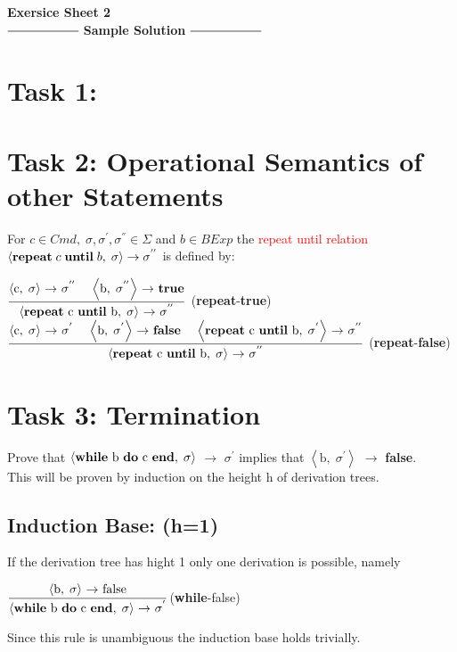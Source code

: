 \documentclass[12pt,a4paper]{article}
\newcommand{\eRelation}[2]{$\dfrac{\text{#1}}{\text{#2}}$}
\newcommand{\eState}[2]{$\left< \text{#1},\; \text{#2}\right>$}
\newcommand{\eRule}[3]{\eState{#1}{#2} $\rightarrow$ #3}
\begin{document}
	\begin{center}
		\huge\textbf{Exersice Sheet 2}\\[0.5cm]
	
		\Large
		$\mathrel{\vcenter{\hbox{\rule{2cm}{0.5pt}}}}$ \textbf{Sample 				Solution} $\mathrel{\vcenter{\hbox{\rule{2cm}{0.5pt}}}}$\\[1cm]
	\end{center}
\large
	\section*{Task 1:}
	\section*{Task 2: Operational Semantics of other Statements}
		\indent\indent For $c\in Cmd,\; \sigma , \sigma ^{'}, \sigma ^{''} \in \Sigma$ and $b\in BExp$ the \textcolor{red}{repeat until relation}\\\indent $\left< \text{\textbf{repeat}}\; c\; \text{\textbf{until}}\; b,\; \sigma \right> \rightarrow \sigma ^{''}$ is defined by:\\
		
		\begin{center}
			\eRelation
				{\eRule{c}{$\sigma$}{$\sigma ^{''}$ \quad \eRule{b}{$\sigma ^{''}$}{\textbf{true}}}}
				{\eRule{\textbf{repeat} c \textbf{until} b}{$\sigma$}{$\sigma ^{''}$}}
			(\textbf{repeat}-\textbf{true})\\[0.75cm]
			\eRelation
				{\eRule{c}{$\sigma$}{$\sigma ^{'}$} \quad \eRule{b}{$\sigma ^{'}$}{\textbf{false}} \quad \eRule{\textbf{repeat} c \textbf{until} b}{$\sigma ^{'}$}{$\sigma ^{''}$}}
				{\eRule{\textbf{repeat} c \textbf{until} b}{$\sigma$}{$\sigma ^{''}$}}
			(\textbf{repeat}-\textbf{false})\\
		\end{center}
	\section*{Task 3: Termination}
		\indent\indent Prove that \eRule{\textbf{while} b \textbf{do} c \textbf{end}}{$\sigma$}{$\sigma ^{'}$} implies that \eRule{b}{$\sigma ^{'}$}{\textbf{false}}.\\
		\indent This will be proven by induction on the height h of derivation trees.\\
		\subsection*{Induction Base: (h=1)}
		\indent\indent If the derivation tree has hight 1 only one derivation is possible, namely\\
		\begin{center}
			\eRelation
				{\eRule{b}{$\sigma$}{false}}
				{\eRule{\textbf{while} b \textbf{do} c \textbf{end}}{$\sigma$}{$\sigma ^{'}$}}(\textbf{while}-false)
		\end{center}
		\indent\indent Since this rule is unambiguous the induction base holds trivially.\\
\end{document}
